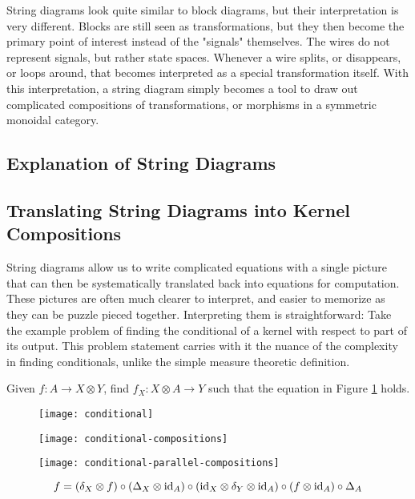String diagrams look quite similar to block diagrams, but their interpretation is very different.
Blocks are still seen as transformations, but they then become the primary point of interest instead of the "signals" themselves.
The wires do not represent signals, but rather state spaces.
Whenever a wire splits, or disappears, or loops around, that becomes interpreted as a special transformation itself.
With this interpretation, a string diagram simply becomes a tool to draw out complicated compositions of transformations, or morphisms in a symmetric monoidal category.

\subsection{Explanation of String Diagrams}

\subsection{Translating String Diagrams into Kernel Compositions}
String diagrams allow us to write complicated equations with a single picture that can then be systematically translated back into equations for computation.
These pictures are often much clearer to interpret, and easier to memorize as they can be puzzle pieced together.
Interpreting them is straightforward: Take the example problem of finding the conditional of a kernel with respect to part of its output.
This problem statement carries with it the nuance of the complexity in finding conditionals, unlike the simple measure theoretic definition.

Given $f:A\rightarrow X\otimes Y$, find $f_X : X\otimes A \rightarrow Y$ such that the equation in Figure \ref{fig:conditional} holds.

\begin{figure}
\label{fig:conditional}
\texttt{[image: conditional]}
\end{figure}

\begin{figure}
\label{fig:conditional-compositions}
\texttt{[image: conditional-compositions]}
\end{figure}

\begin{figure}
\label{fig:conditional-parallel-compositions}
\texttt{[image: conditional-parallel-compositions]}
\end{figure}

\begin{equation}
\label{eq:conditional-compositions}
f = (\delta_X \otimes f) \circ (\Delta_X \otimes \mathrm{id}_A)
\circ (\mathrm{id}_X \otimes \delta_Y \otimes \mathrm{id}_A) \circ (f \otimes \mathrm{id}_A) \circ \Delta_A
\end{equation}

